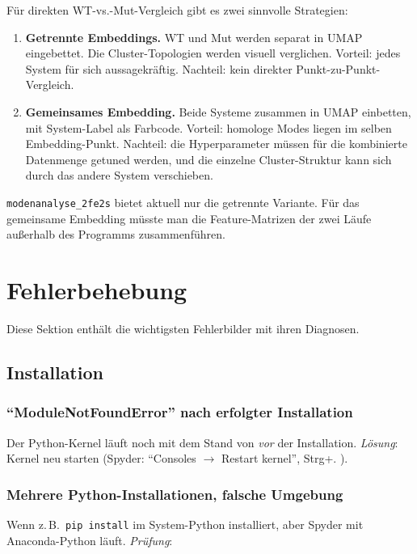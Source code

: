 \documentclass[11pt,a4paper,twoside]{article}
\theoremstyle{remark}
\begin{document}
F\"ur direkten WT-vs.-Mut-Vergleich gibt es zwei sinnvolle
Strategien:

\begin{enumerate}
  \item \textbf{Getrennte Embeddings.} WT und Mut werden separat in
        UMAP eingebettet. Die Cluster-Topologien werden visuell
        verglichen. Vorteil: jedes System f\"ur sich aussagekr\"aftig.
        Nachteil: kein direkter Punkt-zu-Punkt-Vergleich.
  \item \textbf{Gemeinsames Embedding.} Beide Systeme zusammen in
        UMAP einbetten, mit System-Label als Farbcode. Vorteil:
        homologe Modes liegen im selben Embedding-Punkt. Nachteil:
        die Hyperparameter m\"ussen f\"ur die kombinierte Datenmenge
        getuned werden, und die einzelne Cluster-Struktur kann sich
        durch das andere System verschieben.
\end{enumerate}

\texttt{modenanalyse\_2fe2s} bietet aktuell nur die getrennte Variante.
F\"ur das gemeinsame Embedding m\"usste man die Feature-Matrizen
der zwei L\"aufe au\ss erhalb des Programms zusammenf\"uhren.


\section{Fehlerbehebung}
\label{sec:fehlerbehebung}

Diese Sektion enth\"alt die wichtigsten Fehlerbilder mit ihren
Diagnosen.

\subsection{Installation}

\subsubsection*{``ModuleNotFoundError'' nach erfolgter Installation}

Der Python-Kernel l\"auft noch mit dem Stand von \emph{vor} der
Installation. \emph{L\"osung}: Kernel neu starten (Spyder:
``Consoles $\to$ Restart kernel'', Strg+. ).

\subsubsection*{Mehrere Python-Installationen, falsche Umgebung}

Wenn z.\,B.\ \texttt{pip install} im System-Python installiert, aber
Spyder mit Anaconda-Python l\"auft. \emph{Pr\"ufung}:
\end{document}
